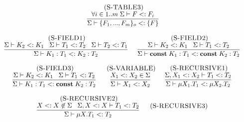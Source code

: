\begin{figure}[!ht]
\begin{footnotesize}
$$\begin{array}{c}
\begin{array}{c}
\end{array}
\;
\begin{array}{c}
\mylabel{S-TABLE3}\\
\dfrac{\forall i \in 1..m \; \senv \vdash F \subtype F_{i}}
      {\senv \vdash \{F_{1}, ..., F_{m}\}_{o} \subtype \{F\}} 
\end{array}
\\ \\
\begin{array}{c}
\mylabel{S-FIELD1}\\
\dfrac{\senv \vdash K_{2} \subtype K_{1} \;\;\;
       \senv \vdash T_{1} \subtype T_{2} \;\;\;
       \senv \vdash T_{2} \subtype T_{1}}
      {\senv \vdash K_{1}:T_{1} \subtype K_{2}:T_{2}}
\end{array}
\;
\begin{array}{c}
\mylabel{S-FIELD2}\\
\dfrac{\senv \vdash K_{2} \subtype K_{1} \;\;\;
       \senv \vdash T_{1} \subtype T_{2}}
      {\senv \vdash \Const \; K_{1}:T_{1} \subtype \Const \; K_{2}:T_{2}}
\end{array}
\\ \\
\begin{array}{c}
\mylabel{S-FIELD3}\\
\dfrac{\senv \vdash K_{2} \subtype K_{1} \;\;\;
       \senv \vdash T_{1} \subtype T_{2}}
      {\senv \vdash K_{1}:T_{1} \subtype \Const \; K_{2}:T_{2}}
\end{array}
\;
\begin{array}{c}
\mylabel{S-VARIABLE}\\
\dfrac{X_{1} \subtype X_{2} \in \senv}
      {\senv \vdash X_{1} \subtype X_{2}}
\end{array}
\;
\begin{array}{c}
\mylabel{S-RECURSIVE1}\\
\dfrac{\senv, X_{1} \subtype X_{2} \vdash T_{1} \subtype T_{2}}
      {\senv \vdash \mu X_{1}.T_{1} \subtype \mu X_{2}.T_{2}}
\end{array}
\\ \\
\begin{array}{c}
\mylabel{S-RECURSIVE2}\\
\dfrac{X \subtype X \not\in \senv \;\;\;
      \senv, X \subtype X \vdash T_{1} \subtype T_{2}}
      {\senv \vdash \mu X.T_{1} \subtype T_{2}}
\end{array}
\;
\begin{array}{c}
\mylabel{S-RECURSIVE3}\\

\end{array}
\end{array}$$
\end{footnotesize}
\end{figure}
